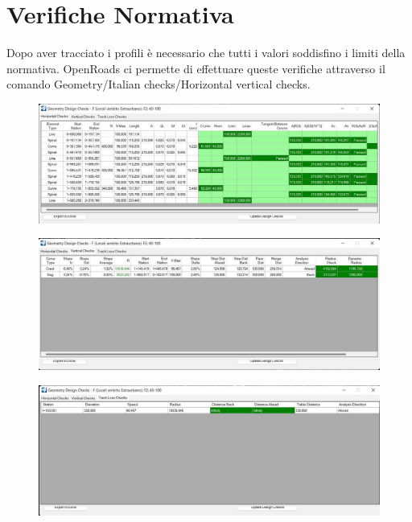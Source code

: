 \chapter{Verifiche Normativa}

Dopo aver tracciato i profili è necessario che tutti i valori soddisfino i limiti della normativa. OpenRoads ci permette di effettuare queste verifiche attraverso il comando Geometry/Italian checks/Horizontal vertical checks.

\begin{figure}[H]
	\centering
	\includegraphics[width=\linewidth]{Figures/Horizontal checks}
    \label{fig:Horizontal checks}
\end{figure}

\begin{figure}[H]
	\centering
	\includegraphics[width=\linewidth]{Figures/Vertical checks}
    \label{fig:Vertical checks}
\end{figure}

\begin{figure}[H]
	\centering
	\includegraphics[width=\linewidth]{Figures/Track Loss Checks}
    \label{fig:Track Loss Checks}
\end{figure}


